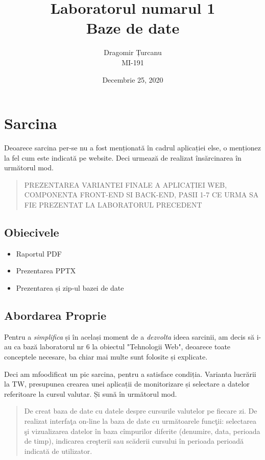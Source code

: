 \documentclass[12pt. a4paper]{report}
\title{%
	Laboratorul numarul 1 \\
	\large Baze de date}
\author{%
	Dragomir Țurcanu \\
	\large MI-191}
\date{Decembrie 25, 2020}
\begin{document}

\maketitle
\tableofcontents

\chapter{Sarcina}


Deoarece sarcina per-se nu a fost menționată în cadrul aplicației else, o menționez la fel cum este indicată pe website. Deci urmează de realizat însărcinarea în următorul mod.

\begin{quote}
PREZENTAREA VARIANTEI FINALE A APLICAȚIEI WEB, COMPONENTA FRONT-END SI BACK-END, PASII 1-7 CE URMA SA FIE PREZENTAT LA LABORATORUL PRECEDENT
\end{quote}

\section{Obiecivele}

\begin{itemize}
	\item Raportul PDF
	\item Prezentarea PPTX
	\item Prezentarea și zip-ul bazei de date
\end{itemize}

\section{Abordarea Proprie}
Pentru a \emph{simplifica} și în același moment de a \emph{dezvolta} ideea sarcinii, am decis să i-au ca bază laboratorul nr 6 la obiectul "Tehnologii Web", deoarece toate conceptele necesare, ba chiar mai multe sunt folosite și explicate.

Deci am mfoodificat un pic sarcina, pentru a satisface condiția. Varianta lucrării la TW, presupunea crearea unei aplicații de monitorizare și selectare a datelor referitoare la cursul valutar. Și sună în următorul mod.

\begin{quote}
De creat baza de date cu datele despre cursurile valutelor pe fiecare zi. De realizat interfaţa on-line la baza
de date cu următoarele funcţii: selectarea şi vizualizarea datelor în baza cîmpurilor diferite (denumire, data,
perioada de timp), indicarea creşterii sau scăderii cursului în perioada perioadă indicată de utilizator.
\end{quote}
\end{document}
